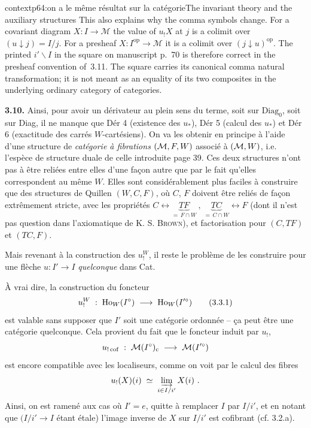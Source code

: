 \begin{dcomment}{context}{p64:on a le même résultat sur la catégorie}{The invariant theory and the auxiliary structures}
This also explains why the comma symbols change. For a covariant diagram $X:I\to\mathcal M$ the value of $u_!X$ at $j$ is a colimit over $(u\downarrow j)=I/j$. For a presheaf $X:I^{\mathrm{op}}\to\mathcal M$ it is a colimit over $(j\downarrow u)^{\mathrm{op}}$. The printed $i'\backslash I$ in the square on manuscript p.~70 is therefore correct in the presheaf convention of~3.11. The square carries its canonical comma natural transformation; it is not meant as an equality of its two composites in the underlying ordinary category of categories.
\end{dcomment}


\textbf{3.10.} Ainsi, pour avoir un dérivateur au plein sens du terme, soit sur $\mathrm{Diag}_0$, soit sur Diag, il ne manque que Dér 4 (existence des $u_*$), Dér 5 (calcul des $u_*$) et Dér 6 (exactitude des carrés $W$-cartésiens). On va les obtenir en principe à l'aide d'une structure de \textit{catégorie à fibrations} $(\mathcal{M},F,W)$ associé à $(\mathcal{M},W)$, i.e. l'espèce de structure duale de celle introduite %
page 39. Ces deux structures n'ont pas à être reliées entre elles d'une façon autre que par le fait qu'elles correspondent au même $W$. Elles sont considérablement plus faciles à construire que des structures de Quillen $(W,C,F)$, où $C$, $F$ doivent être reliés de façon extrêmement stricte, avec les propriétés $C \longleftrightarrow \underbrace{TF}_{=\,F\cap W}\ ,\ \underbrace{TC}_{=\,C\cap W} \longleftrightarrow F$ (dont il n'est pas question dans l'axiomatique de K. S. \textsc{Brown}), et factorisation pour $(C,TF)$ et $(TC,F)$.

Mais revenant à la construction des $u_!^W$, il reste le problème de les construire pour une flèche $u : I'\longrightarrow I$ \textit{quelconque} dans Cat. %

À vrai dire, la construction du foncteur
\[
u_!^W \;:\; \Ho_W(I^\circ) \;\longrightarrow\; \Ho_W(I'^\circ) \tag*{(3.3.1)}
\]
est valable sans supposer que $I'$ soit une catégorie ordonnée – ça peut être une catégorie quelconque. Cela provient du fait que le foncteur induit par $u_!$,
\[
u_{!\,\mathrm{cof}} \;:\; \mathcal{M}(I^\circ)_{\mathrm{c}} \;\longrightarrow\; \mathcal{M}(I'^\circ)
\]
est encore compatible avec les localiseurs, comme on voit par le calcul des fibres
\[
u_!(X)(i) \;\simeq\; \varinjlim_{i\in I/i'} X(i)\ . %
\]
Ainsi, on est ramené aux cas où $I' = e$, quitte à remplacer $I$ par $I/i'$, et en notant que %
$(I/i'\longrightarrow I$ étant étale) l'image inverse de $X$ sur $I/i'$ est cofibrant (cf. 3.2.a). %

